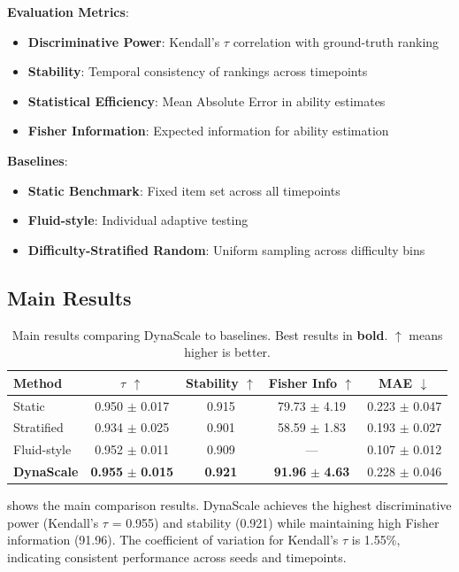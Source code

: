 \documentclass{article}
\begin{document}
\textbf{Evaluation Metrics}:
\begin{itemize}
    \item \textbf{Discriminative Power}: Kendall's $\tau$ correlation with ground-truth ranking
    \item \textbf{Stability}: Temporal consistency of rankings across timepoints
    \item \textbf{Statistical Efficiency}: Mean Absolute Error in ability estimates
    \item \textbf{Fisher Information}: Expected information for ability estimation
\end{itemize}

\textbf{Baselines}:
\begin{itemize}
    \item \textbf{Static Benchmark}: Fixed item set across all timepoints
    \item \textbf{Fluid-style}: Individual adaptive testing \citep{hofmann2025fluid}
    \item \textbf{Difficulty-Stratified Random}: Uniform sampling across difficulty bins
\end{itemize}

\subsection{Main Results}

\begin{table}[t]
\caption{Main results comparing DynaScale to baselines. Best results in \textbf{bold}. $\uparrow$ means higher is better.}
\label{tab:main}
\centering
\begin{tabular}{lcccc}
\toprule
Method & $\tau$ $\uparrow$ & Stability $\uparrow$ & Fisher Info $\uparrow$ & MAE $\downarrow$ \\
\midrule
Static & 0.950 $\pm$ 0.017 & 0.915 & 79.73 $\pm$ 4.19 & 0.223 $\pm$ 0.047 \\
Stratified & 0.934 $\pm$ 0.025 & 0.901 & 58.59 $\pm$ 1.83 & 0.193 $\pm$ 0.027 \\
Fluid-style & 0.952 $\pm$ 0.011 & 0.909 & --- & 0.107 $\pm$ 0.012 \\
\textbf{DynaScale} & \textbf{0.955} $\pm$ \textbf{0.015} & \textbf{0.921} & \textbf{91.96} $\pm$ \textbf{4.63} & 0.228 $\pm$ 0.046 \\
\bottomrule
\end{tabular}
\end{table}

 shows the main comparison results. DynaScale achieves the highest discriminative power (Kendall's $\tau$ = 0.955) and stability (0.921) while maintaining high Fisher information (91.96). The coefficient of variation for Kendall's $\tau$ is 1.55\%, indicating consistent performance across seeds and timepoints.
\end{document}
